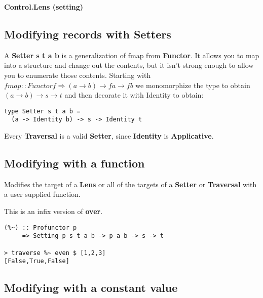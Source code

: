 {\huge \bfseries Control.Lens (setting) \\[0.2cm]}

\HRule%

\begin{multicols}{2}

\begin{box1}
\subsection *{Modifying records with Setters}
A \textbf{Setter s t a b} is a generalization of fmap from \textbf{Functor}. It
allows you to map into a structure and change out the contents, but it isn't
strong enough to allow you to enumerate those contents. Starting with
$fmap :: Functor f \Rightarrow (a \to b) \to f a \to f b$ we monomorphize the type
to obtain $(a \to b) \to s \to t$ and then decorate it with Identity to obtain:

\begin{verbatim}
type Setter s t a b =
  (a -> Identity b) -> s -> Identity t
\end{verbatim}

Every \textbf{Traversal} is a valid \textbf{Setter}, since \textbf{Identity} is
\textbf{Applicative}.

\end{box1}

\begin{box2}
\subsection *{Modifying with a function}

Modifies the target of a \textbf{Lens} or all of the targets of a
\textbf{Setter} or \textbf{Traversal} with a user supplied function.

This is an infix version of \textbf{over}.

\begin{verbatim}
(%~) :: Profunctor p
     => Setting p s t a b -> p a b -> s -> t

> traverse %~ even $ [1,2,3]
[False,True,False]
\end{verbatim}
\end{box2}

\begin{box1}
\subsection *{Modifying with a constant value}


\end{box1}
\end{multicols}
